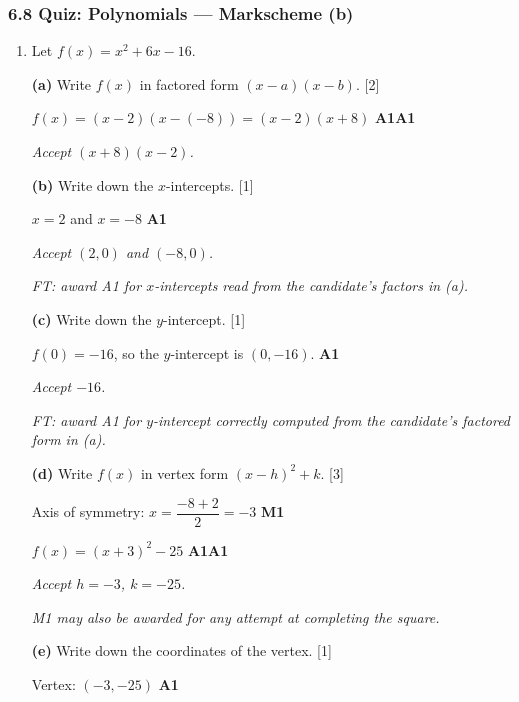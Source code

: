 \documentclass[12pt, twoside]{article}
\begin{document}
\subsubsection*{6.8 Quiz: Polynomials --- Markscheme (b)}

\begin{enumerate}[itemsep=0.3cm]

\item[1.] [Maximum mark: 8]

Let $f(x) = x^2 + 6x - 16$.

\medskip

\textbf{(a)} Write $f(x)$ in factored form $(x - a)(x - b)$. \hfill [2]

$f(x) = (x - 2)(x - (-8)) = (x - 2)(x + 8)$ \hfill \textbf{A1A1}

\emph{Accept $(x + 8)(x - 2)$.}

\medskip

\textbf{(b)} Write down the $x$-intercepts. \hfill [1]

$x = 2$ and $x = -8$ \hfill \textbf{A1}

\emph{Accept $(2, 0)$ and $(-8, 0)$.}

\emph{FT: award A1 for $x$-intercepts read from the candidate's factors in (a).}

\medskip

\textbf{(c)} Write down the $y$-intercept. \hfill [1]

$f(0) = -16$, so the $y$-intercept is $(0, -16)$. \hfill \textbf{A1}

\emph{Accept $-16$.}

\emph{FT: award A1 for $y$-intercept correctly computed from the candidate's factored form in (a).}

\medskip

\textbf{(d)} Write $f(x)$ in vertex form $(x - h)^2 + k$. \hfill [3]

Axis of symmetry: $x = \dfrac{-8 + 2}{2} = -3$ \hfill \textbf{M1}

$f(x) = (x + 3)^2 - 25$ \hfill \textbf{A1A1}

\emph{Accept $h = -3$, $k = -25$.}

\emph{M1 may also be awarded for any attempt at completing the square.}

\medskip

\textbf{(e)} Write down the coordinates of the vertex. \hfill [1]

Vertex: $(-3, -25)$ \hfill \textbf{A1}


\end{enumerate}
\end{document}

